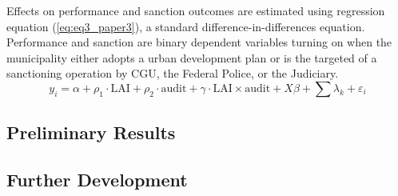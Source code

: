 \documentclass[11pt]{article}
\newcommand{\refp}[1]{(\ref{#1})}
\begin{document}
Effects on performance and sanction outcomes are estimated using regression equation \refp{eq:eq3_paper3}, a standard difference-in-differences equation. Performance and sanction are binary dependent variables turning on when the municipality either adopts a urban development plan or is the targeted of a sanctioning operation by CGU, the Federal Police, or the Judiciary.
\begin{equation} \label{eq:eq3_paper3}
  y_{i} = \alpha + \rho_{1} \cdot \text{LAI} + \rho_{2} \cdot \text{audit} + \gamma \cdot \text{LAI} \times \text{audit} + X \beta + \sum \lambda_{k} + \varepsilon_{i}
\end{equation}

\subsection{Preliminary Results} \label{subsec:results_paper3}







\subsection{Further Development} \label{subsec:conclusion_paper3}

\clearpage

\setlength\bibsep{0pt}


\end{document}

